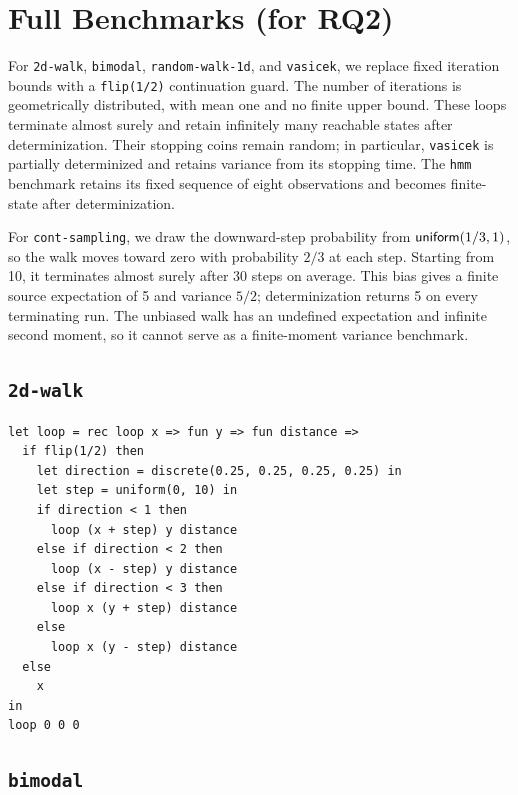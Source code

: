 

\section{Full Benchmarks (for RQ2)}\label{sec:appendix-infinite-benchmarks}

For \texttt{2d-walk}, \texttt{bimodal}, \texttt{random-walk-1d}, and \texttt{vasicek}, we replace fixed iteration bounds with a \texttt{flip(1/2)} continuation guard. The number of iterations is geometrically distributed, with mean one and no finite upper bound. These loops terminate almost surely and retain infinitely many reachable states after determinization. Their stopping coins remain random; in particular, \texttt{vasicek} is partially determinized and retains variance from its stopping time. The \texttt{hmm} benchmark retains its fixed sequence of eight observations and becomes finite-state after determinization.

For \texttt{cont-sampling}, we draw the downward-step probability from $\mathsf{uniform}(1/3,1)$, so the walk moves toward zero with probability $2/3$ at each step. Starting from 10, it terminates almost surely after 30 steps on average. This bias gives a finite source expectation of 5 and variance $5/2$; determinization returns 5 on every terminating run. The unbiased walk has an undefined expectation and infinite second moment, so it cannot serve as a finite-moment variance benchmark.

\subsection{\texttt{2d-walk}}

\begin{lstlisting}[breaklines=true]
let loop = rec loop x => fun y => fun distance =>
  if flip(1/2) then
    let direction = discrete(0.25, 0.25, 0.25, 0.25) in
    let step = uniform(0, 10) in
    if direction < 1 then
      loop (x + step) y distance
    else if direction < 2 then
      loop (x - step) y distance
    else if direction < 3 then
      loop x (y + step) distance
    else
      loop x (y - step) distance
  else
    x
in
loop 0 0 0
\end{lstlisting}

\subsection{\texttt{bimodal}}

